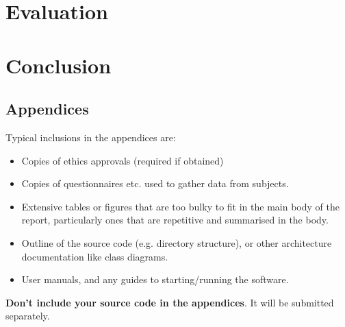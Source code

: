 \documentclass{l4proj}
\begin{document}
\chapter{Evaluation} 

\chapter{Conclusion}    

\begin{appendices}

\chapter{Appendices}

Typical inclusions in the appendices are:

\begin{itemize}
\item
  Copies of ethics approvals (required if obtained)
\item
  Copies of questionnaires etc. used to gather data from subjects.
\item
  Extensive tables or figures that are too bulky to fit in the main body of
  the report, particularly ones that are repetitive and summarised in the body.

\item Outline of the source code (e.g. directory structure), or other architecture documentation like class diagrams.

\item User manuals, and any guides to starting/running the software.

\end{itemize}

\textbf{Don't include your source code in the appendices}. It will be
submitted separately.

\end{appendices}






\end{document}
